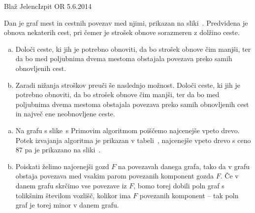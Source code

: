 \begin{naloga}{Blaž Jelenc}{Izpit OR 5.6.2014}
\begin{vprasanje}
Dan je graf mest in cestnih povezav med njimi, prikazan na sliki~\fig.
Predvidena je obnova nekaterih cest,
pri čemer je strošek obnove sorazmeren z dolžino ceste.

\begin{enumerate}[(a)]
\item Določi ceste, ki jih je potrebno obnoviti,
da bo strošek obnove čim manjši,
ter da bo med poljubnima dvema mestoma
obstajala povezava preko samih obnovljenih cest.

\item Zaradi nižanja stroškov preuči še naslednjo možnost.
Določi ceste, ki jih je potrebno obnoviti, da bo strošek obnove čim manjši,
ter da bo med poljubnima dvema mestoma obstajala povezava
preko samih obnovljenih cest in največ ene neobnovljene ceste.
\end{enumerate}

\begin{slika}
\pgfslika
{}
\end{slika}
\end{vprasanje}

\begin{odgovor}
\begin{enumerate}[(a)]
\item Na grafu s slike~\fig s Primovim algoritmom poiščemo najcenejše vpeto drevo.
Potek izvajanja algoritma je prikazan v tabeli~\tab,
najcenejše vpeto drevo s ceno $87$
pa je prikazano na sliki~.

\item Poiskati želimo najcenejši gozd $F$ na povezavah danega grafa,
tako da v grafu obstaja povezava med vsakim parom povezanih komponent gozda $F$.
Če v danem grafu skrčimo vse povezave iz $F$,
bomo torej dobili poln graf s to\-lik\-šnim številom vozlišč,
kolikor ima $F$ povezanih komponent
-- tak poln graf je torej minor v danem grafu.


\end{enumerate}
\end{odgovor}
\end{naloga}
